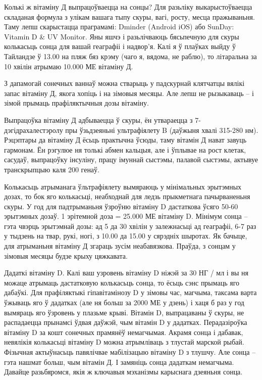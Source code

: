 Колькі ж вітаміну Д выпрацоўваецца на сонцы? Для разьліку выкарыстоўваецца складаная формула з улікам вашага тыпу скуры, вагі, росту, месца пражываньня. Таму лепш скарыстацца праграмамі: Dminder (Android iOS) або SunDay: Vitamin D & UV Monitor. Яны яшчэ і разьлічваюць бясьпечную для скуры колькасьць сонца для вашай геаграфіі і надвор'я. Калі я ў плаўках выйду ў Тайландзе ў 13.00 на пляж бяз крэму (чаго я, вядома, не раблю), то літаральна за 10 хвілін атрымаю 10.000 МЕ вітаміну Д. 

З дапамогай сонечных ваннаў можна стварыць у падскурнай клятчатцы вялікі запас вітаміну Д, якога хопіць і на зімовыя месяцы. Але лепш не рызыкаваць – і зімой прымаць прафіляктычныя дозы вітаміну. 

Выпрацоўка вітаміну Д адбываецца ў скуры, ён утвараецца з 7-дэгідрахалестэролу пры ўзьдзеяньні ультрафіялету B (даўжыня хвалі 315-280 нм). Рэцэптары да вітаміну Д ёсьць практычна ўсюды, таму вітамін Д нават завуць гармонам. Ён рэгулюе ня толькі абмен кальцыя, але і ўплывае на рост клетак, сасудаў, выпрацоўку інсуліну, працу імуннай сыстэмы, палавой сыстэмы, актывуе транскрыпцыю каля 200 генаў.

Колькасьць атрыманага ўльтрафіялету вымяраюць у мінімальных эрытэмных дозах, то бок яго колькасьці, неабходнай для ледзь прыкметнага пачырваненьня скуры. У год для падтрыманьня ўзроўню вітаміну D дастаткова ўсяго 50-60 эрытэмных дозаў. 1 эрітемной доза = 25.000 МЕ вітаміну D. Мінімум сонца – гэта чвэрць эрытэмнай дозы: ад 5 да 30 хвілін у залежнасьці ад геаграфіі, 6-7 раз у тыдзень на твар, рукі, ногі, з 10.00 да 15.00 у сярэдніх шыротах. Як бачыце, для атрыманьня вітаміну Д згараць зусім неабавязкова. Праўда, з сонцам у зімовыя месяцы будзе крыху цяжкавата.

Дадаткі вітаміну D. Калі ваш узровень вітаміну D ніжэй за 30 НГ / мл і вы ня можаце атрымаць дастатковую колькасьць сонца, то ёсьць сэнс прымаць яго дабаўкі. Для прафіляктыкі гіпавітамінозу D у зімовы час, магчыма, таксама варта ўжываць яго ў дадатках (але ня больш за 2000 МЕ у дзень) і хаця б раз у год вымяраць яго ўзровень у плазьме крыві. Вітамін D, выпрацаваны ў скуры, не распадаецца прынамсі ўдвая даўжэй, чым вітамін D у дадатках. Перадазіроўка вітаміну D за кошт сонечных прамянёў немагчымая. Акрамя сонца і дабавак, невялікія колькасьці вітаміну D можна атрымліваць з тлустай марской рыбай. Фізычная актыўнасьць павялічвае мабілізацыю вітаміну D з тлушчу. Але сонца – гэта нашмат больш, чым вітамін Д. І замяніць сонца дадаткам немагчыма. Давайце разьбяромся, якія ж ключавыя мэханізмы карыснага дзеяньня сонца.

